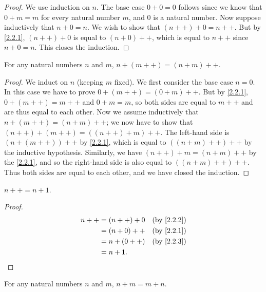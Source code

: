 \begin{proof}
  We use induction on \(n\).
  The base case \(0 + 0 = 0\) follows since we know that \(0 + m = m\) for every natural number \(m\), and \(0\) is a natural number.
  Now suppose inductively that \(n + 0 = n\).
  We wish to show that \((n++) + 0 = n++\).
  But by \cref{2.2.1}, \((n++) + 0\) is equal to \((n + 0)++\), which is equal to \(n++\) since \(n + 0 = n\).
  This closes the induction.
\end{proof}

\begin{lem}\label{2.2.3}
  For any natural numbers \(n\) and \(m\), \(n + (m++) = (n + m)++\).
\end{lem}

\begin{proof}
  We induct on \(n\) (keeping \(m\) fixed).
  We first consider the base case \(n = 0\).
  In this case we have to prove \(0 + (m++) = (0 + m)++\).
  But by \cref{2.2.1}, \(0 + (m++) = m++\) and \(0 + m = m\), so both sides are equal to \(m++\) and are thus equal to each other.
  Now we assume inductively that \(n + (m++) = (n + m)++\);
  we now have to show that \((n++) + (m++) = ((n++) + m)++\).
  The left-hand side is \((n + (m++))++\) by \cref{2.2.1}, which is equal to \(((n+m)++)++\) by the inductive hypothesis.
  Similarly, we have \((n++) + m = (n + m)++\) by the \cref{2.2.1}, and so the right-hand side is also equal to \(((n + m)++)++\).
  Thus both sides are equal to each other, and we have closed the induction.
\end{proof}

\begin{ac}\label{ac:2.2.2}
  \(n++ = n + 1\).
\end{ac}

\begin{proof}
  \begin{align*}
    n++ & = (n++) + 0 & \text{(by \cref{2.2.2})} \\
        & = (n + 0)++ & \text{(by \cref{2.2.1})} \\
        & = n + (0++) & \text{(by \cref{2.2.3})} \\
        & = n + 1.
  \end{align*}
\end{proof}

\begin{prop}\label{2.2.4}
  For any natural numbers \(n\) and \(m\), \(n + m = m + n\).
\end{prop}

